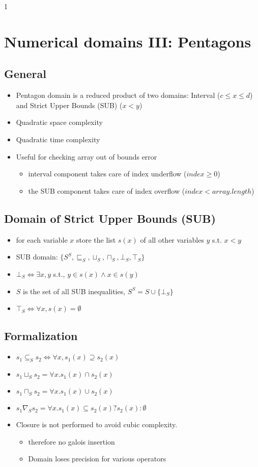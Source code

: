 1\chapter{Numerical domains III: Pentagons}
\section{General}
\begin{itemize}
\item Pentagon domain is a reduced product of two domains: Interval ($c \leq x \leq d$) and Strict Upper Bounds (SUB) ($x < y$)
\item Quadratic space complexity
\item Quadratic time complexity
\item Useful for checking array out of bounds error
\begin{itemize}
\item interval component takes care of index underflow ($index \geq 0$)
\item the SUB component takes care of index overflow ($index < array.length$)
\end{itemize}
\end{itemize}
\section{Domain of Strict Upper Bounds (SUB)}
\begin{itemize}
\item for each variable $x$ store the list $s(x)$ of all other variables $y$ s.t. $x<y$
\item SUB domain: $\{S^S, \sqsubseteq_S,\sqcup_S,\sqcap_S,\bot_S,\top_S\}$
\item $\bot_S \iff \exists x,y$ s.t., $y \in s(x) \wedge x \in s(y)$
\item $S$ is the set of all SUB inequalities, $S^S=S \cup \{\bot_S\}$
\item $\top_S \iff \forall x,s(x)=\emptyset$
\end{itemize}
\section{Formalization}
\begin{itemize}
\item $s_1 \subseteq_S s_2 \iff \forall x, s_1(x) \supseteq s_2(x)$
\item $s_1 \sqcup_S s_2 = \forall x.s_1(x) \cap s_2(x)$
\item $s_1 \sqcap_S s_2 = \forall x.s_1(x) \cup s_2(x)$
\item $s_1 \nabla_S s_2 = \forall x.s_1(x) \subseteq s_2(x) ? s_2(x) : \emptyset$
\item Closure is not performed to avoid cubic complexity. 
\begin{itemize}
\item therefore no galois insertion 
\item Domain loses precision for various operators
\end{itemize}
\end{itemize}
\noindent
